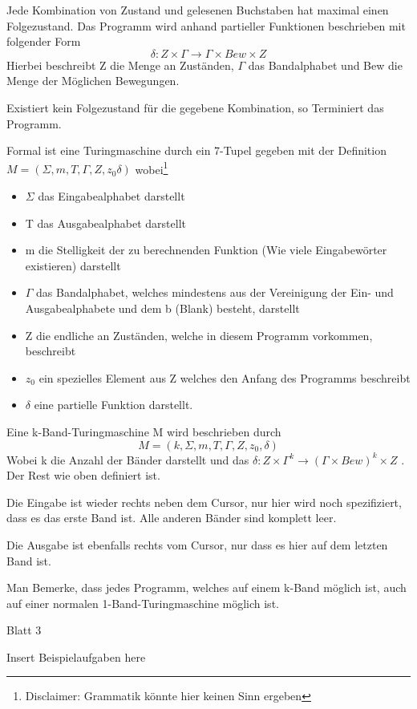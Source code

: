 \documentclass[12pt,a4paper]{article} %
\begin{document}
	Jede Kombination von Zustand und gelesenen Buchstaben hat maximal einen Folgezustand. Das Programm wird anhand partieller Funktionen beschrieben mit folgender Form \[\delta: Z \times \Gamma \rightarrow \Gamma \times Bew \times Z\]
	Hierbei beschreibt Z die Menge an Zuständen, $\Gamma$ das Bandalphabet und Bew die Menge der Möglichen Bewegungen.
	
	Existiert kein Folgezustand für die gegebene Kombination, so Terminiert das Programm.
	
	Formal ist eine Turingmaschine durch ein 7-Tupel gegeben mit der Definition $M = (\Sigma, m, T, \Gamma, Z, z_0 \delta)$ wobei\footnote{Disclaimer: Grammatik könnte hier keinen Sinn ergeben}
	
	\begin{itemize}
		\item $\Sigma$ das Eingabealphabet darstellt
		\item T das Ausgabealphabet darstellt
		\item m die Stelligkeit der zu berechnenden Funktion (Wie viele Eingabewörter existieren) darstellt
		\item $\Gamma$ das Bandalphabet, welches mindestens aus der Vereinigung der Ein- und Ausgabealphabete und dem b (Blank) besteht, darstellt
		\item Z die endliche an Zuständen, welche in diesem Programm vorkommen, beschreibt
		\item $z_0$ ein spezielles Element aus Z welches den Anfang des Programms beschreibt
		\item $\delta$ eine partielle Funktion darstellt.
	\end{itemize}
	
	Eine k-Band-Turingmaschine M wird beschrieben durch \[M = (k, \Sigma, m, T, \Gamma, Z, z_0, \delta)\] Wobei k die Anzahl der Bänder darstellt und das $\delta: Z \times \Gamma^k \rightarrow (\Gamma \times Bew)^k \times Z$ . Der Rest wie oben definiert ist.
	
	Die Eingabe ist wieder rechts neben dem Cursor, nur hier wird noch spezifiziert, dass es das erste Band ist. Alle anderen Bänder sind komplett leer.
	
	Die Ausgabe ist ebenfalls rechts vom Cursor, nur dass es hier auf dem letzten Band ist.
	
	Man Bemerke, dass jedes Programm, welches auf einem k-Band möglich ist, auch auf einer normalen 1-Band-Turingmaschine möglich ist.
	
	Blatt 3
	
	Insert Beispielaufgaben here
	
\end{document}
